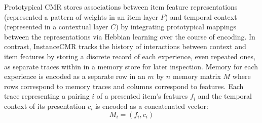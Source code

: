 {}Prototypical CMR stores associations between item feature representations (represented a pattern of weights in an item layer $F$) and temporal context (represented in a contextual layer $C$) by integrating prototypical mappings between the representations via Hebbian learning over the course of encoding. In contrast, InstanceCMR tracks the history of interactions between context and item features by storing a discrete record of each experience, even repeated ones, as separate traces within in a memory store for later inspection. Memory for each experience is encoded as a separate row in an $m$ by $n$ memory matrix $M$ where rows correspond to memory traces and columns correspond to features. Each trace representing a pairing $i$ of a presented item’s features $f_i$ and the temporal context of its presentation $c_i$ is encoded as a concatenated vector:\markdownRendererInterblockSeparator
{}\begin{equation} \label{eq:14}M_i = (f_i, c_i)\end{equation}\relax